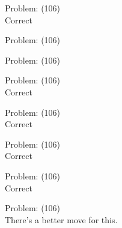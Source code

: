 \documentclass[11pt]{article}
\begin{document}
\begin{minipage}[t]{0.5\textwidth}
  {\centering
  
  Problem: (106)\\
  Correct\\
  }
\end{minipage}
\begin{minipage}[t]{0.5\textwidth}
  {\centering
  
  Problem: (106)\\
  
  }
\end{minipage}
\begin{minipage}[t]{0.5\textwidth}
  {\centering
  
  Problem: (106)\\
  
  }
\end{minipage}
\begin{minipage}[t]{0.5\textwidth}
  {\centering
  
  Problem: (106)\\
  Correct\\
  }
\end{minipage}
\begin{minipage}[t]{0.5\textwidth}
  {\centering
  
  Problem: (106)\\
  Correct\\
  }
\end{minipage}
\begin{minipage}[t]{0.5\textwidth}
  {\centering
  
  Problem: (106)\\
  Correct\\
  }
\end{minipage}
\begin{minipage}[t]{0.5\textwidth}
  {\centering
  
  Problem: (106)\\
  Correct\\
  }
\end{minipage}
\begin{minipage}[t]{0.5\textwidth}
  {\centering
  
  Problem: (106)\\
  There's a better move for this.\\
  }
\end{minipage}
\end{document}
